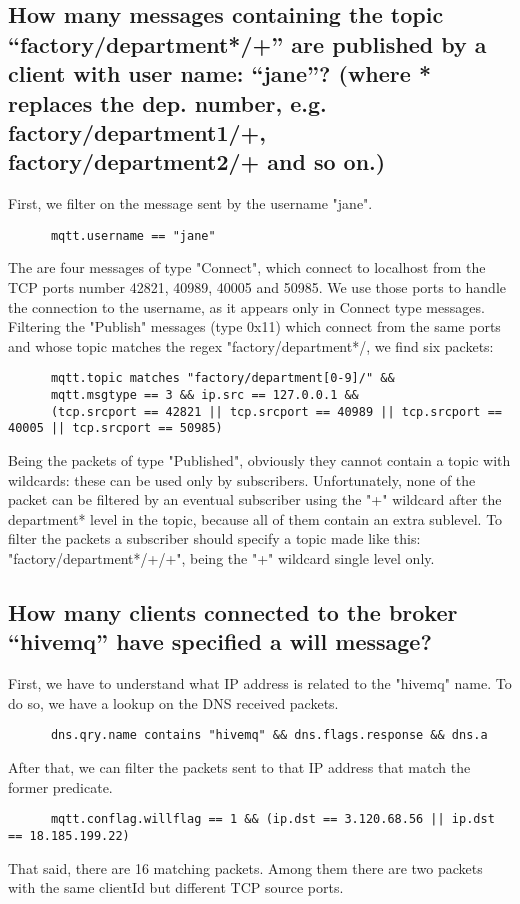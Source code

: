\documentclass[12pt]{article}
\begin{document}
    \subsection{How many messages containing the topic
    “factory/department*/+” are published by a client with
    user name: “jane”? \small{(where * replaces the dep. number,
    e.g. factory/department1/+, factory/department2/+
    and so on.)}}
    First, we filter on the message sent by the username "jane".
    \begin{lstlisting}
      mqtt.username == "jane"
    \end{lstlisting}
    The are four messages of type "Connect", which connect to localhost from the TCP ports number 
    42821, 40989, 40005 and 50985.
    We use those ports to handle the connection to the username, as it appears only in Connect type messages.
    Filtering the "Publish" messages (type 0x11) which connect from the same ports and whose topic
    matches the regex "factory/department*/, we find six packets:
    \begin{lstlisting}
      mqtt.topic matches "factory/department[0-9]/" &&
      mqtt.msgtype == 3 && ip.src == 127.0.0.1 && 
      (tcp.srcport == 42821 || tcp.srcport == 40989 || tcp.srcport == 40005 || tcp.srcport == 50985) 
    \end{lstlisting}
    Being the packets of type "Published", obviously they cannot contain a topic with wildcards: these can be used only
    by subscribers.
    Unfortunately, none of the packet can be filtered by an eventual subscriber using the "+" wildcard after the department* level
    in the topic, because all of them contain an extra sublevel. To filter the packets a subscriber should specify a topic made like
    this: "factory/department*/+/+", being the "+" wildcard single level only.
    \subsection{How many clients connected to the broker “hivemq”
    have specified a will message?}
    First, we have to understand what IP address is related to the "hivemq" name. To do so, we 
    have a lookup on the DNS received packets.
    \begin{lstlisting}
      dns.qry.name contains "hivemq" && dns.flags.response && dns.a
    \end{lstlisting}
    After that, we can filter the packets sent to that IP address that match the former predicate.
    \begin{lstlisting}
      mqtt.conflag.willflag == 1 && (ip.dst == 3.120.68.56 || ip.dst == 18.185.199.22)
    \end{lstlisting}
    That said, there are 16 matching packets. Among them there are two packets with the same clientId but 
    different TCP source ports.
\end{document}

